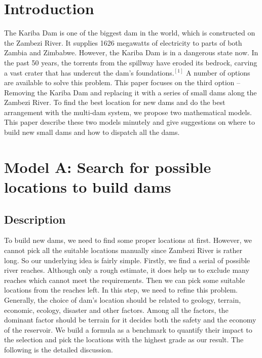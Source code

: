 \documentclass{mcmthesis}
\begin{document}
\section{Introduction}
\indent \indent The Kariba Dam is one of the biggest dam in the world, which is constructed on the Zambezi River. It supplies 1626 megawatts of electricity to parts of both Zambia and Zimbabwe. However, the Kariba Dam is in a dangerous state now. In the past 50 years, the torrents from the spillway have eroded its bedrock, carving a vast crater that has undercut the dam's foundations.$^{[1]}$ A number of options are available to solve this problem. This paper focuses on the third option -- Removing the Kariba Dam and replacing it with a series of small dams along the Zambezi River. To find the best location for new dams and do the best arrangement with the multi-dam system, we propose two mathematical models. This paper describe these two models minutely and give suggestions on where to build new small dams and how to dispatch all the dams. \\


\section{Model A: Search for possible locations to build dams}
\subsection{Description}
\indent \indent To build new dams, we need to find some proper locations at first. However, we cannot pick all the suitable locations manually since Zambezi River is rather long. So our underlying idea is fairly simple. Firstly, we find a serial of possible river reaches. Although only a rough estimate, it does help us to exclude many reaches which cannot meet the requirements. Then we can pick some suitable locations from the reaches left. In this step, we need to refine this problem. Generally, the choice of dam's location should be related to geology, terrain, economic, ecology, disaster and other factors. Among all the factors, the dominant factor should be terrain for it decides both the safety and the economy of the reservoir. We build a formula as a benchmark to quantify their impact to the selection and pick the locations with the highest grade as our result. The following is the detailed discussion. 
\end{document}
